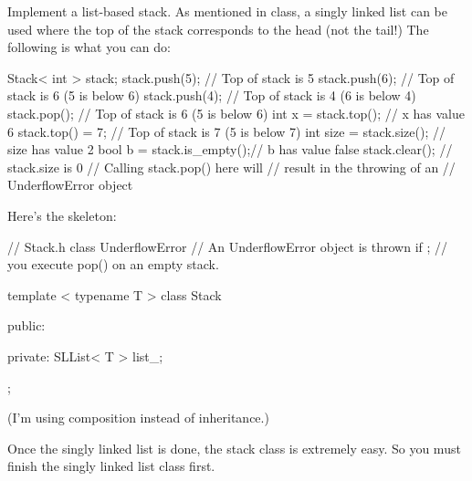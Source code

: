 Implement a list-based stack.
As mentioned in class, a singly linked list can be used where the 
top of the stack corresponds to the head (not the tail!)
The following is what you can do:
\begin{console}[fontsize=\footnotesize,commandchars=\\\{\}]
Stack< int > stack;
stack.push(5);            // Top of stack is 5
stack.push(6);            // Top of stack is 6 (5 is below 6)
stack.push(4);            // Top of stack is 4 (6 is below 4)
stack.pop();              // Top of stack is 6 (5 is below 6)
int x = stack.top();      // x has value 6
stack.top() = 7;          // Top of stack is 7 (5 is below 7)
int size = stack.size();  // size has value 2
bool b = stack.is_empty();// b has value false
stack.clear();            // stack.size is 0
                          // Calling stack.pop() here will
                          // result in the throwing of an 
                          // UnderflowError object
\end{console} 
Here's the skeleton:
\begin{console}[fontsize=\footnotesize]
// Stack.h
class UnderflowError      // An UnderflowError object is thrown if
{};                       // you execute pop() on an empty stack.

template < typename T >
class Stack
{
public:

private:
    SLList< T > list_;
};
\end{console}
(I'm using composition instead of inheritance.)

Once the singly linked list is done, the stack class is extremely easy.
So you must finish the singly linked list class first.
